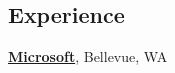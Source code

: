 \documentclass[margin,line]{res}
\begin{document}
\begin{resume}
\section{\sc Experience}
{\bf \href{http://microsoft.com}{Microsoft}}, Bellevue, WA \\
% 
% 
% 
% 

\end{resume}
\end{document}
